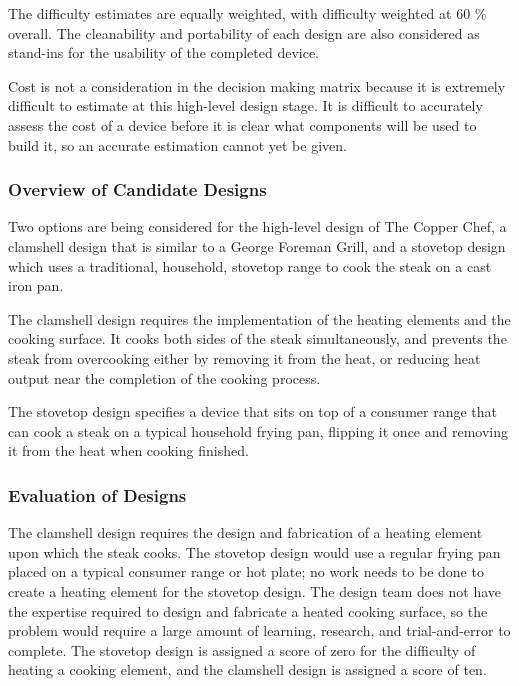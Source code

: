 \documentclass[11pt]{article}
\begin{document}
The difficulty estimates are equally weighted, with difficulty weighted at 60 \% overall.
The cleanability and portability of each design are also considered as stand-ins for the usability of the completed device.

Cost is not a consideration in the decision making matrix because it is extremely difficult to estimate at this high-level design stage.
It is difficult to accurately assess the cost of a device before it is clear what components will be used to build it, so an accurate estimation cannot yet be given.

\subsubsection{Overview of Candidate Designs}

Two options are being considered for the high-level design of The Copper Chef, a clamshell design that is similar to a George Foreman Grill, and a stovetop design which uses a traditional, household, stovetop range to cook the steak on a cast iron pan.

The clamshell design requires the implementation of the heating elements and the cooking surface.
It cooks both sides of the steak simultaneously, and prevents the steak from overcooking either by removing it from the heat, or reducing heat output near the completion of the cooking process.

The stovetop design specifies a device that sits on top of a consumer range that can cook a steak on a typical household frying pan, flipping it once and removing it from the heat when cooking finished.

\subsubsection{Evaluation of Designs}

The clamshell design requires the design and fabrication of a heating element upon which the steak cooks.
The stovetop design would use a regular frying pan placed on a typical consumer range or hot plate; no work needs to be done to create a heating element for the stovetop design.
The design team does not have the expertise required to design and fabricate a heated cooking surface, so the problem would require a large amount of learning, research, and trial-and-error to complete.
The stovetop design is assigned a score of zero for the difficulty of heating a cooking element, and the clamshell design is assigned a score of ten.
\end{document}

